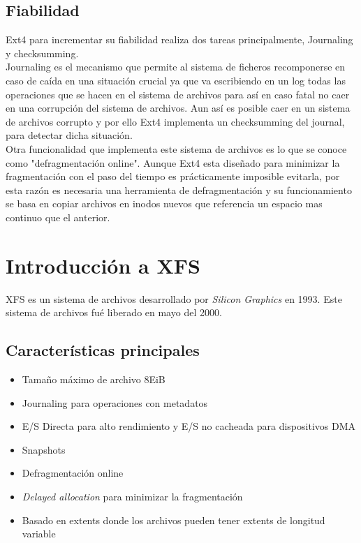 \subsection{Fiabilidad}
Ext4 para incrementar su fiabilidad realiza dos tareas principalmente, Journaling y checksumming.\\

Journaling es el mecanismo que permite al sistema de ficheros recomponerse en caso de caída en una situación crucial ya que va escribiendo en un log todas las operaciones que se hacen en el sistema de archivos para así en caso fatal no caer en una corrupción del sistema de archivos. Aun así es posible caer en un sistema de archivos corrupto y por ello Ext4 implementa un checksumming del journal, para detectar dicha situación.\\

Otra funcionalidad que implementa este sistema de archivos es lo que se conoce como "defragmentación online". Aunque Ext4 esta diseñado para minimizar la fragmentación con el paso del tiempo es prácticamente imposible evitarla, por esta razón es necesaria una herramienta de defragmentación y su funcionamiento se basa en copiar archivos en inodos nuevos que referencia un espacio mas continuo que el anterior.


\section{Introducción a XFS}
XFS es un sistema de archivos desarrollado por \textit{Silicon Graphics} en 1993. Este sistema de archivos fué liberado en mayo del 2000.

\subsection{Características principales}
\begin{itemize}
    \item Tamaño máximo de archivo 8EiB
    \item Journaling para operaciones con metadatos
    \item E/S Directa para alto rendimiento y E/S no cacheada para dispositivos DMA
    \item Snapshots
    \item Defragmentación online
    \item \textit{Delayed allocation} para minimizar la fragmentación
    \item Basado en extents donde los archivos pueden tener extents de longitud variable
\end{itemize}

